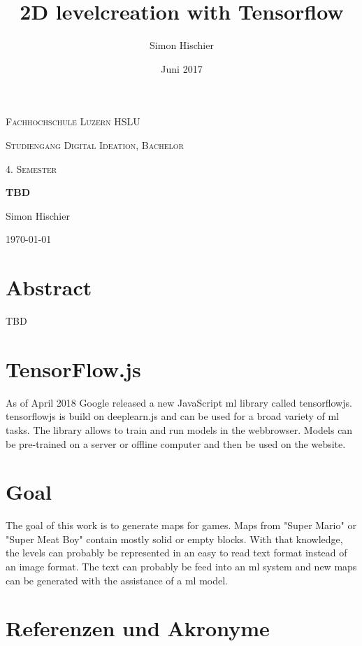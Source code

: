 \documentclass[10pt]{article}
\title{2D levelcreation with Tensorflow}
\author{Simon Hischier}
\date{Juni 2017}
\begin{document}
\begin{titlepage}
\centering
\vspace{1cm}
	{\scshape\LARGE Fachhochschule Luzern HSLU \par}
	\vspace{1cm}
	{\scshape\Large Studiengang Digital Ideation, Bachelor \par}
	
	{\scshape\Large 4. Semester\par}
	\vspace{1.5cm}
	{\huge\bf TBD\par}
	
	
	\vspace{10cm}
	{\Large Simon Hischier\par}
	\vfill

	{\large \today\par}

\end{titlepage}

\renewcommand{\contentsname}{Inhalt}
\tableofcontents
\newpage

\section{Abstract}
TBD

\section{TensorFlow.js}
As of April 2018 Google released a new JavaScript \gls{ml} library called \gls{tensorflowjs}. \gls{tensorflowjs} is build on deeplearn.js and can be used for a broad variety of \gls{ml} tasks. The library allows to train and run models in the webbrowser. Models can be pre-trained on a server or offline computer and then be used on the website.

\section{Goal}
The goal of this work is to generate maps for games. Maps from "Super Mario" or "Super Meat Boy" contain mostly solid or empty blocks. With that knowledge, the levels can probably be represented in an easy to read text format instead of an image format. The text can probably be feed into an \gls{ml} system and new maps can be generated with the assistance of a \gls{ml} model.

\section{Referenzen und Akronyme}

\printglossaries




\end{document}
